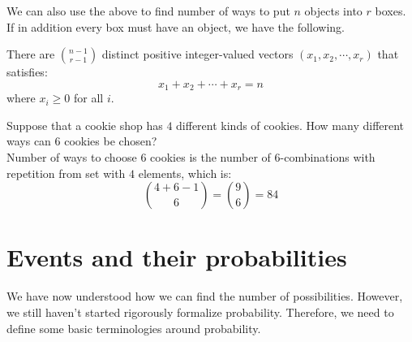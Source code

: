 \documentclass{huhtakm-template-book}
\begin{document}
We can also use the above to find number of ways to put $n$ objects into $r$ boxes. If in addition every box must have an object, we have the following.
\begin{thm}
	There are $\binom{n-1}{r-1}$ distinct positive integer-valued vectors $(x_{1},x_{2},\cdots,x_{r})$ that satisfies:
	\begin{equation*}
		x_{1}+x_{2}+\cdots+x_{r}=n
	\end{equation*}
	where $x_{i}\geq 0$ for all $i$.
\end{thm}
\begin{eg}
	Suppose that a cookie shop has $4$ different kinds of cookies. How many different ways can $6$ cookies be chosen?\\
	Number of ways to choose $6$ cookies is the number of $6$-combinations with repetition from set with $4$ elements, which is:
	\begin{equation*}
		\binom{4+6-1}{6}=\binom{9}{6}=84
	\end{equation*}
\end{eg}


\chapter{Events and their probabilities}
We have now understood how we can find the number of possibilities. However, we still haven't started rigorously formalize probability. Therefore, we need to define some basic terminologies around probability.
\end{document}
